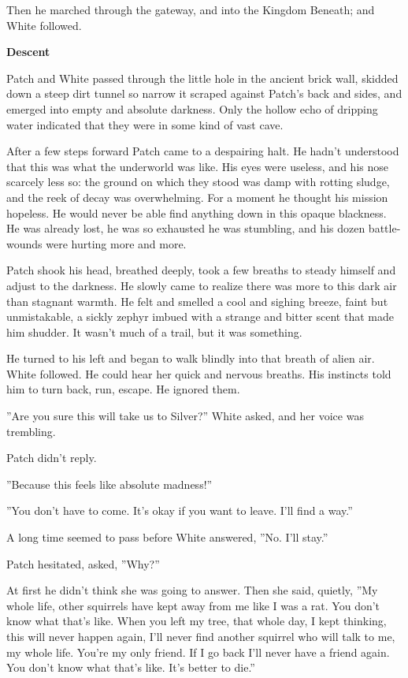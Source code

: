 \documentclass[11pt]{article}
\begin{document}
 Then he marched through the gateway, and into the Kingdom Beneath; and White followed.\par
{}\par
{\bf Descent\par
}\par
 Patch and White passed through the little hole in the ancient brick wall, skidded down a steep dirt tunnel so narrow it scraped against Patch's back and sides, and emerged into empty and absolute darkness. Only the hollow echo of dripping water indicated that they were in some kind of vast cave.\par
 After a few steps forward Patch came to a despairing halt. He hadn't understood that this was what the underworld was like. His eyes were useless, and his nose scarcely less so: the ground on which they stood was damp with rotting sludge, and the reek of decay was overwhelming. For a moment he thought his mission hopeless. He would never be able find anything down in this opaque blackness. He was already lost, he was so exhausted he was stumbling, and his dozen battle-wounds were hurting more and more. \par
 Patch shook his head, breathed deeply, took a few breaths to steady himself and adjust to the darkness. He slowly came to realize there was more to this dark air than stagnant warmth. He felt and smelled a cool and sighing breeze, faint but unmistakable, a sickly zephyr imbued with a strange and bitter scent that made him shudder. It wasn't much of a trail, but it was something.\par
He turned to his left and began to walk blindly into that breath of alien air. White followed. He could hear her quick and nervous breaths. His instincts told him to turn back, run, escape. He ignored them.\par
 ''Are you sure this will take us to Silver?'' White asked, and her voice was trembling.\par
 Patch didn't reply.\par
 ''Because this feels like absolute madness!''\par
 ''You don't have to come. It's okay if you want to leave. I'll find a way.''\par
 A long time seemed to pass before White answered, ''No. I'll stay.''\par
 Patch hesitated, asked, ''Why?''\par
 At first he didn't think she was going to answer. Then she said, quietly, ''My whole life, other squirrels have kept away from me like I was a rat. You don't know what that's like. When you left my tree, that whole day, I kept thinking, this will never happen again, I'll never find another squirrel who will talk to me, my whole life. You're my only friend. If I go back I'll never have a friend again. You don't know what that's like. It's better to die.''\par
\end{document}
